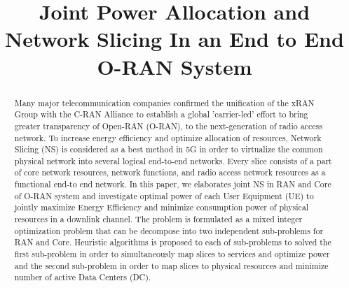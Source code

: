 \documentclass[conference]{IEEEtran}
\begin{document}
\title{Joint Power Allocation and Network Slicing In an End to End O-RAN System
}

\author{
\and
{}

}

\maketitle

\begin{abstract}
Many major telecommunication companies confirmed the unification of the xRAN Group with the C-RAN Alliance to establish a global 'carrier-led' effort to bring greater transparency of Open-RAN 
(O-RAN), to the next-generation of radio access network. \newline
To increase energy efficiency and optimize allocation of resources, Network Slicing (NS) is considered as a best method in 5G in order to virtualize the common physical network into several logical end-to-end networks. Every slice consists of a part of core network resources, network functions, and radio access network resources as a functional end-to end network. \newline
In this paper, we elaborates joint NS in RAN and Core of O-RAN system and investigate optimal power 
of each User Equipment (UE) to jointly maximize Energy Efficiency and minimize consumption power of physical resources in a downlink channel. The problem is formulated as a mixed integer optimization problem that can be decompose into two independent sub-problems for RAN and Core. 
Heuristic algorithms is proposed to each of sub-problems to solved the first sub-problem in order to simultaneously map slices to services and optimize power and the second sub-problem in order to map slices to physical resources and minimize number of active Data Centers (DC).
\end{abstract}
\end{document}
